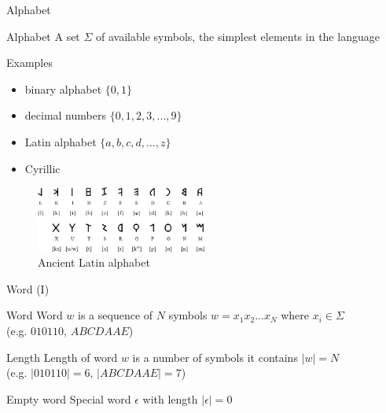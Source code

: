 \documentclass{beamer}
\begin{document}
\begin{frame}{Alphabet}

\begin{block}{Alphabet}
A set $\Sigma$ of available symbols, the simplest elements in the language
\end{block}

\begin{exampleblock}{Examples}
\begin{itemize}
\item binary alphabet $\{0, 1\}$
\item decimal numbers $\{0,1,2,3,...,9\}$
\item Latin alphabet $\{a,b,c,d,...,z\}$
\item Cyrillic
\end{itemize}
\end{exampleblock}

\begin{figure}
\includegraphics[width=0.5\textwidth]{img/latin_archaic.png}
\caption{\label{fig:latin_archaic}Ancient Latin alphabet}
\end{figure}

\end{frame}

\begin{frame}{Word (I)}
\begin{block}{Word}
Word $w$ is a sequence of $N$ symbols $w = x_1x_2...x_N$ where $x_i\in\Sigma$ \\ (e.g. $010110$, $ABCDAAE$)
\end{block}

\begin{block}{Length}
Length of word $w$ is a number of symbols it contains $|w|=N$ \\ (e.g. $|010110| = 6$, $|ABCDAAE| = 7$)
\end{block}

\begin{alertblock}{Empty word}
Special word $\epsilon$ with length $|\epsilon|=0$
\end{alertblock}

\end{frame}
\end{document}
